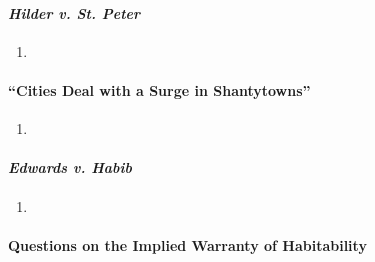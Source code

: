 \paragraph{\emph{Hilder v. St. Peter}}

\begin{enumerate}
    \item %
\end{enumerate}


\paragraph{``Cities Deal with a Surge in Shantytowns''}

\begin{enumerate}
    \item %
\end{enumerate}

\paragraph{\emph{Edwards v. Habib}}

\begin{enumerate}
    \item %
\end{enumerate}

\paragraph{Questions on the Implied Warranty of Habitability}

